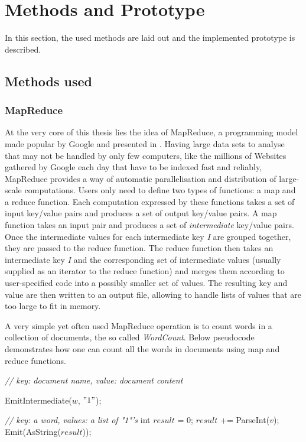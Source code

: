 \chapter{Methods and Prototype}

In this section, the used methods are laid out and the implemented prototype is described. 
\section{Methods used}
\subsection{MapReduce}
At the very core of this thesis lies the idea of MapReduce, a programming model made popular by Google and presented in \cite{Dean2008}. Having large data sets to analyse that may not be handled by only few computers, like the millions of Websites gathered by Google each day that have to be indexed fast and reliably, MapReduce  provides a way of automatic parallelisation and distribution of large-scale computations. Users only need to define two types of functions: a map and a reduce function. Each computation expressed by these functions takes a set of input key/value pairs and produces a set of output key/value pairs.
A map function takes an input pair and produces a set of \textit{intermediate} key/value pairs. Once the intermediate values for each intermediate key \textit{I} are grouped together, they are passed to the reduce function. 
The reduce function then takes an intermediate key \textit{I} and the corresponding set of intermediate values (usually supplied as an iterator to the reduce function) and merges them according to user-specified code into a possibly smaller set of values. The resulting key and value are then written to an output file, allowing to handle lists of values that are too large to fit in memory. 

A very simple yet often used MapReduce operation is to count words in a collection of documents, the so called \textit{WordCount}. Below pseudocode demonstrates how one can count all the words in documents using map and reduce functions.

\begin{algorithmic}
\State \textit{// key: document name, value: document content}

\State EmitIntermediate($w$, $"1"$);
\EndFor
\EndFunction


\State \textit{// key: a word, values: a list of "1"'s}
\State int $result$ = 0;
\State $result$ += ParseInt($v$);
\EndFor
\State Emit(AsString($result$));
\EndFunction
\end{algorithmic}

